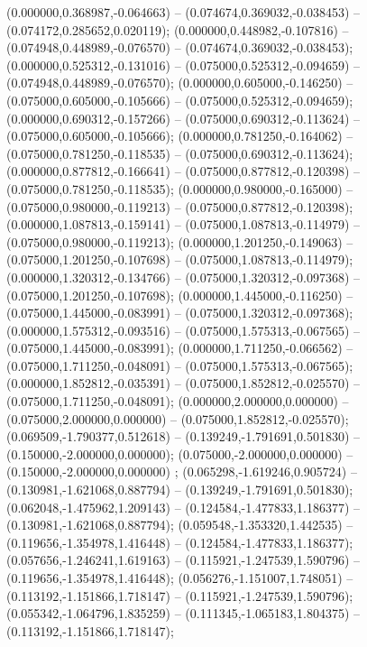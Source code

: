  (0.000000,0.368987,-0.064663) -- (0.074674,0.369032,-0.038453) -- (0.074172,0.285652,0.020119);
 (0.000000,0.448982,-0.107816) -- (0.074948,0.448989,-0.076570) -- (0.074674,0.369032,-0.038453);
 (0.000000,0.525312,-0.131016) -- (0.075000,0.525312,-0.094659) -- (0.074948,0.448989,-0.076570);
 (0.000000,0.605000,-0.146250) -- (0.075000,0.605000,-0.105666) -- (0.075000,0.525312,-0.094659);
 (0.000000,0.690312,-0.157266) -- (0.075000,0.690312,-0.113624) -- (0.075000,0.605000,-0.105666);
 (0.000000,0.781250,-0.164062) -- (0.075000,0.781250,-0.118535) -- (0.075000,0.690312,-0.113624);
 (0.000000,0.877812,-0.166641) -- (0.075000,0.877812,-0.120398) -- (0.075000,0.781250,-0.118535);
 (0.000000,0.980000,-0.165000) -- (0.075000,0.980000,-0.119213) -- (0.075000,0.877812,-0.120398);
 (0.000000,1.087813,-0.159141) -- (0.075000,1.087813,-0.114979) -- (0.075000,0.980000,-0.119213);
 (0.000000,1.201250,-0.149063) -- (0.075000,1.201250,-0.107698) -- (0.075000,1.087813,-0.114979);
 (0.000000,1.320312,-0.134766) -- (0.075000,1.320312,-0.097368) -- (0.075000,1.201250,-0.107698);
 (0.000000,1.445000,-0.116250) -- (0.075000,1.445000,-0.083991) -- (0.075000,1.320312,-0.097368);
 (0.000000,1.575312,-0.093516) -- (0.075000,1.575313,-0.067565) -- (0.075000,1.445000,-0.083991);
 (0.000000,1.711250,-0.066562) -- (0.075000,1.711250,-0.048091) -- (0.075000,1.575313,-0.067565);
 (0.000000,1.852812,-0.035391) -- (0.075000,1.852812,-0.025570) -- (0.075000,1.711250,-0.048091);
 (0.000000,2.000000,0.000000) -- (0.075000,2.000000,0.000000) -- (0.075000,1.852812,-0.025570);
 (0.069509,-1.790377,0.512618) -- (0.139249,-1.791691,0.501830) -- (0.150000,-2.000000,0.000000);
 (0.075000,-2.000000,0.000000) -- (0.150000,-2.000000,0.000000) ;
 (0.065298,-1.619246,0.905724) -- (0.130981,-1.621068,0.887794) -- (0.139249,-1.791691,0.501830);
 (0.062048,-1.475962,1.209143) -- (0.124584,-1.477833,1.186377) -- (0.130981,-1.621068,0.887794);
 (0.059548,-1.353320,1.442535) -- (0.119656,-1.354978,1.416448) -- (0.124584,-1.477833,1.186377);
 (0.057656,-1.246241,1.619163) -- (0.115921,-1.247539,1.590796) -- (0.119656,-1.354978,1.416448);
 (0.056276,-1.151007,1.748051) -- (0.113192,-1.151866,1.718147) -- (0.115921,-1.247539,1.590796);
 (0.055342,-1.064796,1.835259) -- (0.111345,-1.065183,1.804375) -- (0.113192,-1.151866,1.718147);
